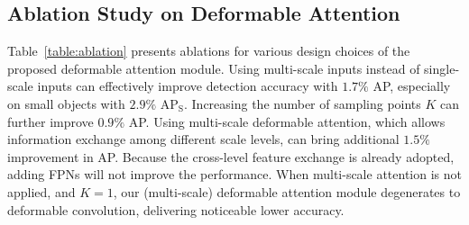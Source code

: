 \subsection{Ablation Study on Deformable Attention}
\label{sec:ablation}

Table~\ref{table:ablation} presents ablations for various design choices of the proposed deformable attention module. Using multi-scale inputs instead of single-scale inputs can effectively improve detection accuracy with $1.7\%$ AP, especially on small objects with $2.9\%$ AP$_\text{S}$. Increasing the number of sampling points $K$ can further improve $0.9\%$ AP. Using multi-scale deformable attention, which allows information exchange among different scale levels, can bring additional $1.5\%$ improvement in AP. Because the cross-level feature exchange is already adopted, adding FPNs will not improve the performance. When multi-scale attention is not applied, and $K=1$, our (multi-scale) deformable attention module degenerates to deformable convolution, delivering noticeable lower accuracy.


\setlength{\tabcolsep}{3pt}
\renewcommand{\arraystretch}{1.2}
\begin{table}[ht]
\caption{Ablations for deformable attention on COCO 2017 val set. ``MS inputs'' indicates using multi-scale inputs. ``MS attention'' indicates using multi-scale deformable attention. $K$ is the number of sampling points for each attention head on each feature level.}
\label{table:ablation}
\begin{center}
\small
{}
\end{center}
\vspace{-1em}
\end{table}






